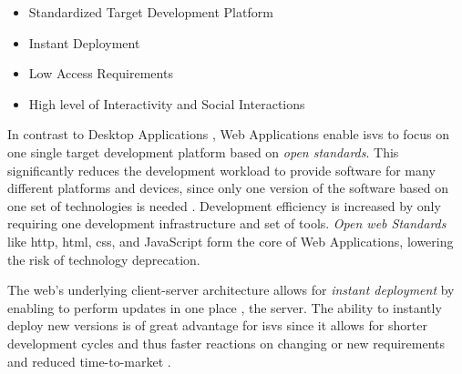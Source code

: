 \begin{itemize}
\tightlist
\item
  Standardized Target Development Platform
\item
  Instant Deployment
\item
  Low Access Requirements
\item
  High level of Interactivity and Social Interactions
\end{itemize}
\par
In contrast to \glspl{Desktop Application} \autocite{Puder2004a}, \glspl{Web Application} enable \glspl{isv} to focus on one single target development platform based on \emph{open standards}.
This significantly reduces the development workload to provide software for many different platforms and devices, since only one version of the software based on one set of technologies is needed \autocite{OReilly2007Web2.0}.
Development efficiency is increased by only requiring one development infrastructure and set of tools.
\emph{Open \Gls{web} Standards} like \gls{http}, \gls{html}, \gls{css}, and JavaScript form the core of \glspl{Web Application}, lowering the risk of technology deprecation.

The \Gls{web}'s underlying client-server architecture allows for \emph{instant deployment} by enabling to perform updates in one place \autocite{Gitzel2007WebEngineeringMDD}, the server. %
The ability to instantly deploy new versions is of great advantage for \glspl{isv} since it allows for shorter development cycles and thus faster reactions on changing or new requirements and reduced time-to-market \autocite{Khadka2014ProfessionalsModernization,Fowley2017CloudSME}.

